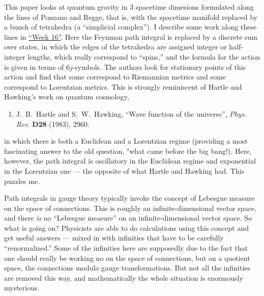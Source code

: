 \documentclass[12pt]{article}
\def\tightlist{}
\renewcommand{\texttt}[1]{%
  \begingroup
  \ttfamily
  \begingroup\lccode`~=`/\lowercase{\endgroup\def~}{/\discretionary{}{}{}}%
  \begingroup\lccode`~=`[\lowercase{\endgroup\def~}{[\discretionary{}{}{}}%
  \begingroup\lccode`~=`.\lowercase{\endgroup\def~}{.\discretionary{}{}{}}%
  \catcode`/=\active\catcode`[=\active\catcode`.=\active
  \scantokens{#1\noexpand}%
  \endgroup
}
\begin{document}
This paper looks at quantum gravity in 3 spacetime dimesions formulated
along the lines of Ponzano and Regge, that is, with the spacetime
manifold replaced by a bunch of tetrahedra (a ``simplicial complex''). I
describe some work along these lines in
\protect\hyperlink{week16}{``Week 16''}. Here the Feynman path integral
is replaced by a discrete sum over states, in which the edges of the
tetrahedra are assigned integer or half-integer lengths, which really
correspond to ``spins,'' and the formula for the action is given in
terms of \(6j\)-symbols. The authors look for stationary points of this
action and find that some correspond to Riemannian metrics and some
correspond to Lorentzian metrics. This is strongly reminiscent of Hartle
and Hawking's work on quantum cosmology,

\begin{enumerate}
\def\labelenumi{\arabic{enumi})}
\setcounter{enumi}{3}
\tightlist
\item
     J.\ B.\ Hartle and S.\ W.\ Hawking,
  ``Wave function of the universe'',
  \emph{Phys. Rev.} \textbf{D28} (1983), 2960.
\end{enumerate}

\noindent
in which there is both a Euclidean and a Lorentzian regime (providing a
most fascinating answer to the old question, "what came before the big
bang!). Here, however, the path integral is oscillatory in the Euclidean
regime and exponential in the Lorentzian one --- the opposite of what
Hartle and Hawking had. This puzzles me.


Path integrals in gauge theory typically invoke the concept of Lebesgue
measure on the space of connections. This is roughly an
infinite-dimensional vector space, and there \emph{is} no ``Lebesgue
measure'' on an infinite-dimensional vector space. So what is going on?
Physicists are able to do calculations using this concept and get useful
answers --- mixed in with infinities that have to be carefully
``renormalized.'' Some of the infinities here are supposedly due to the
fact that one should really be working no on the space of connections,
but on a quotient space, the connections modulo gauge transformations.
But not all the infinities are removed this way, and mathematically the
whole situation is enormously mysterious.
\end{document}
